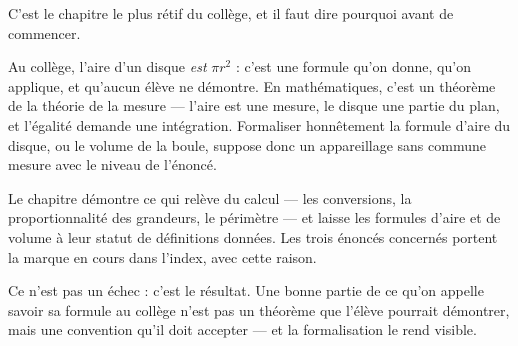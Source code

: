 C'est le chapitre le plus rétif du collège, et il faut dire pourquoi avant de commencer.

Au collège, l'aire d'un disque \emph{est} $\pi r^2$ : c'est une formule qu'on donne, qu'on
applique, et qu'aucun élève ne démontre. En mathématiques, c'est un théorème de la théorie
de la mesure — l'aire est une mesure, le disque une partie du plan, et l'égalité demande une
intégration. Formaliser honnêtement la formule d'aire du disque, ou le volume de la boule,
suppose donc un appareillage sans commune mesure avec le niveau de l'énoncé.

Le chapitre démontre ce qui relève du calcul — les conversions, la proportionnalité des
grandeurs, le périmètre — et laisse les formules d'aire et de volume à leur statut de
définitions données. Les trois énoncés concernés portent la marque \og{} en cours \fg{} dans
l'index, avec cette raison.

Ce n'est pas un échec : c'est le résultat. Une bonne partie de ce qu'on appelle \og{} savoir
sa formule \fg{} au collège n'est pas un théorème que l'élève pourrait démontrer, mais une
convention qu'il doit accepter — et la formalisation le rend visible.
